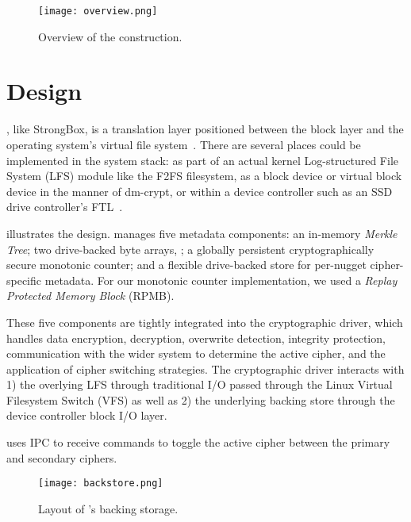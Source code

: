 \begin{figure}[t]
 \centering
  \texttt{[image: overview.png]}
   \caption{Overview of the \SYSTEM{} construction.}\label{fig:overview}
\end{figure}

\section{\SYSTEM{} Design}\label{sec:design}


\SYSTEM{}, like StrongBox, is a translation layer positioned between the block
layer and the operating system's virtual file system~\cite{StrongBox}. There are
several places \SYSTEM{} could be implemented in the system stack: as part of an
actual kernel Log-structured File System (LFS) module like the F2FS filesystem,
as a block device or virtual block device in the manner of dm-crypt, or within a
device controller such as an SSD drive controller's FTL~\cite{StrongBox}.

 illustrates the \SYSTEM{} design. \SYSTEM{} manages five
metadata components: an in-memory \emph{Merkle Tree}; two drive-backed byte
arrays, ; a
globally persistent cryptographically secure monotonic counter; and a flexible
drive-backed store for per-nugget cipher-specific metadata. For our
monotonic counter implementation, we used a \emph{Replay Protected Memory Block}
(RPMB).

These five components are tightly integrated into the cryptographic driver,
which handles data encryption, decryption, overwrite detection, integrity
protection, communication with the wider system to determine the active cipher,
and the application of cipher switching strategies. The cryptographic driver
interacts with 1) the overlying LFS through traditional I/O passed through the
Linux Virtual Filesystem Switch (VFS) as well as 2) the underlying backing store
through the device controller block I/O layer.

\SYSTEM{} uses IPC to receive commands to toggle the active cipher between the
primary and secondary ciphers.

\begin{figure}[t]
 \centering
  \texttt{[image: backstore.png]}
   \caption{Layout of \SYSTEM{}'s backing storage.}\label{fig:backstore}
\end{figure}

